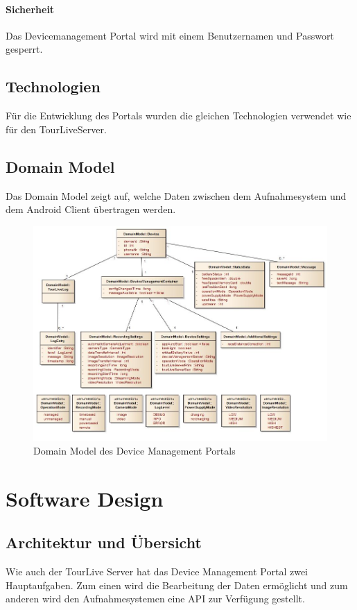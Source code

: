 \paragraph{Sicherheit}
Das Devicemanagement Portal wird mit einem Benutzernamen und Passwort gesperrt. 

\subsection{Technologien}
Für die Entwicklung des Portals wurden die gleichen Technologien verwendet wie für den TourLiveServer. 

\subsection{Domain Model}
Das Domain Model zeigt auf, welche Daten zwischen dem Aufnahmesystem und dem Android Client übertragen werden.

\begin{figure}[H]
	\centering
	\includegraphics[width=120mm]{images/devmgmtsrv/domainmodel.jpg}
	\caption{Domain Model des Device Management Portals}
\end{figure}


\section{Software Design}
\subsection{Architektur und Übersicht}
Wie auch der TourLive Server hat das Device Management Portal zwei Hauptaufgaben. Zum einen wird die Bearbeitung der Daten ermöglicht und zum anderen wird den Aufnahmesystemen eine API zur Verfügung gestellt.


